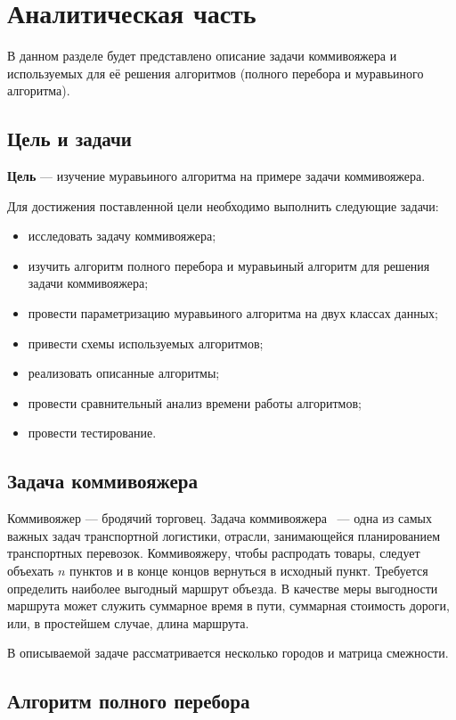 \chapter{Аналитическая часть}

В данном разделе будет представлено описание задачи коммивояжера и используемых для её решения алгоритмов (полного перебора и муравьиного алгоритма).

\section{Цель и задачи}
\textbf{Цель} --- изучение муравьиного алгоритма на примере задачи коммивояжера.

Для достижения поставленной цели необходимо выполнить следующие задачи:

\begin{itemize}[label=---]
	\item исследовать задачу коммивояжера;
	\item изучить алгоритм полного перебора и муравьиный алгоритм для решения задачи коммивояжера;
	\item провести параметризацию муравьиного алгоритма на двух классах данных;
	\item привести схемы используемых алгоритмов;
	\item реализовать описанные алгоритмы;
	\item провести сравнительный анализ времени работы алгоритмов;
	\item провести тестирование.
\end{itemize}

\section{Задача коммивояжера}

Коммивояжер --- бродячий торговец. Задача коммивояжера~\cite{bib1} --- одна из самых важных задач транспортной логистики, отрасли, занимающейся планированием транспортных перевозок. Коммивояжеру, чтобы распродать товары, следует объехать $n$ пунктов и в конце концов вернуться в исходный пункт. Требуется определить наиболее выгодный маршрут объезда. В качестве меры выгодности маршрута может служить суммарное время в пути, суммарная стоимость дороги, или, в простейшем случае, длина маршрута.

В описываемой задаче рассматривается несколько городов и матрица смежности.


\section{Алгоритм полного перебора}


